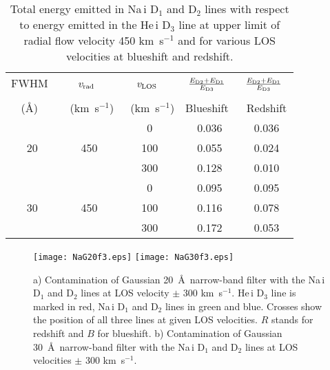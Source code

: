 \documentclass[namedreferences]{solarphysics}
\begin{document}
\begin{article}
\begin{table}  %
\caption{Total energy emitted in Na\,{\sc i} D$_{1}$ and D$_{2}$ lines with respect to energy emitted in the He\,{\sc i} D$_{3}$ line at upper limit of radial flow 
velocity 450 km~s$^{-1}$ and for various LOS velocities at blueshift and redshift.}
\label{t-db}
\begin{tabular}{ccccc}
 \hline FWHM~&{\it v$_{\rm rad}$}~&{\it v$_{\rm LOS}$}~&$\frac{E_{\rm D2}+E_{\rm D1}}{E_{\rm D3}}$~&
          $\frac{E_{\rm D2}+E_{\rm D1}}{E_{\rm D3}}$~ \\
                                                       \\
          (\AA)~&~(km~s$^{-1}$)&~(km~s$^{-1}$)&Blueshift~&Redshift\\
 \hline  &  & 0 & 0.036 & 0.036\\
         20 & 450 & 100 & 0.055 & 0.024 \\
         &  & 300 & 0.128 & 0.010\\
 \hline  &  & 0 & 0.095 & 0.095\\
         30 & 450 & 100 & 0.116 & 0.078 \\
         &  & 300 & 0.172 & 0.053\\
 \hline
\end{tabular}
\end{table} 

\begin{figure}    %
\centerline{\texttt{[image: NaG20f3.eps]}
            \hspace*{0.0\textwidth}
            \texttt{[image: NaG30f3.eps]}
            }
\caption{a) Contamination of Gaussian 20~\AA~narrow-band filter with the Na\,{\sc i} D$_{1}$ and D$_{2}$ lines at LOS velocity $\pm$ 300 km~s$^{-1}$. 
He\,{\sc i} D$_{3}$ line is marked in red, Na\,{\sc i} D$_{1}$ and D$_{2}$ lines in green and blue. Crosses show the position of all three lines at given LOS velocities. 
$R$ stands for redshift and $B$ for blueshift. b) Contamination of Gaussian 30~\AA~narrow-band filter with the  
Na\,{\sc i} D$_{1}$ and D$_{2}$ lines at 
LOS velocities $\pm$ 300 km~s$^{-1}$.}
\label{f-nac}
\end{figure}


\end{article}
\end{document}

